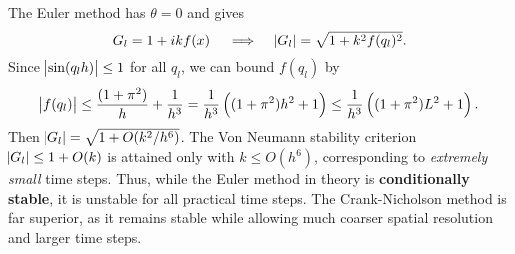 The Euler method has $\theta = 0$ and gives
\begin{equation}
	G_l = 1 + i k f(x) \quad \implies \quad \abs{G_l} = \sqrt{1 + k^2 f(q_l)^2}.
	\label{euler_amplification_factor}
\end{equation}
Since $\abs{\sin(q_l h)} \leq 1$ for all $q_l$, we can bound $f(q_l)$ by
\begin{equation*}
	\abs{f(q_l)} \leq \frac{(1+\pi^2)}{h} + \frac{1}{h^3} = \frac{1}{h^3} \left( (1+\pi^2) h^2 + 1 \right) \leq \frac{1}{h^3} \left( (1+\pi^2) L^2 + 1 \right).
\end{equation*}
Then $\abs{G_l} = \sqrt{1 + O(k^2 / h^6)}$.
The Von Neumann stability criterion $\abs{G_l} \leq 1 + O(k)$ \cite{owren} is attained only with $k \leq O(h^6)$, corresponding to \emph{extremely small} time steps.
Thus, while the Euler method in theory is \textbf{conditionally stable}, it is unstable for all practical time steps.
The Crank-Nicholson method is far superior, as it remains stable while allowing much coarser spatial resolution and larger time steps.


\iffalse
\begin{figure}
\centering
\begin{tikzpicture}
\begin{axis}[title={$N=10$},ylabel=$u$, xlabel=$x$, width=13cm, height=8cm, colorbar, colorbar style={ylabel=$M$}, xmin=-1, xmax=+1]
\addplot [color=black, domain=-1:+1, very thick] {sin(deg(pi*(x-1)))};
\addlegendentry{$\sin(\pi(x-1))$};
\pgfplotsinvokeforeach{20,40,60,80,100,200,300,400,500,600,700,800,900,1000} {
	\addplot [mesh, point meta=#1] table {exercise4/snapshot-crank-nicholson-M#1-N10.dat};
}
\end{axis}
\end{tikzpicture}
\begin{tikzpicture}
\begin{axis}[title={$N=100$},xlabel=$x$, width=13cm, height=8cm, colorbar, colorbar style={ylabel=$M$}, xmin=-1, xmax=+1]
\addplot [xlabel=$x$, color=black, domain=-1:+1, very thick] {sin(deg(pi*(x-1)))};
\addlegendentry{$\sin(\pi(x-1))$};
\pgfplotsinvokeforeach{20,40,60,80,100,200,300,400,500,600,700,800,900,1000} {
	\addplot [mesh, point meta=#1] table {exercise4/snapshot-crank-nicholson-M#1-N100.dat};
}
\end{axis}
\end{tikzpicture}
\end{figure}
\fi

